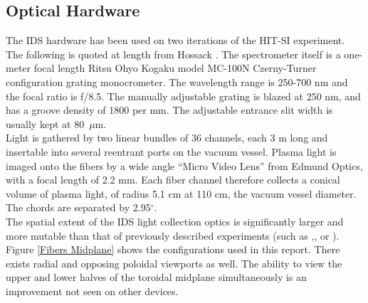 \subsection{Optical Hardware}
\hspace{4ex}The IDS hardware has been used on two iterations of the HIT-SI experiment. The following is quoted at length from  Hossack \cite{hossack2015study}. The spectrometer itself is a one-meter focal length Ritsu Ohyo Kogaku model MC-100N Czerny-Turner configuration grating monocrometer. The wavelength range is 250-700 nm and the focal ratio is f/8.5. The manually adjustable grating is blazed at 250 nm, and has a groove density of 1800 per mm. The adjustable entrance slit width is usually kept at 80~$\mu$m.\\
\hspace*{4ex}Light is gathered by two linear bundles of 36 channels, each 3 m long and insertable into several reentrant ports on the vacuum vessel. Plasma light is imaged onto the fibers by a wide angle ``Micro Video Lens'' from Edmund Optics, with a focal length of 2.2 mm. Each fiber channel therefore collects a conical volume of plasma light, of radius 5.1 cm at 110 cm, the vacuum vessel diameter. The chords are separated by 2.95$^{\circ}$.\\
\hspace*{4ex}The spatial extent of the IDS light collection optics is significantly larger and more mutable than that of previously described experiments (such as \cite{cothran2006fast},\cite{Baciero2001JT-II}, or \cite{den1994fast}). Figure \ref{Fibers Midplane} shows the configurations used in this report. There exists radial and opposing poloidal viewports as well. The ability to view the upper and lower halves of the toroidal midplane simultaneously is an improvement not seen on other devices.
